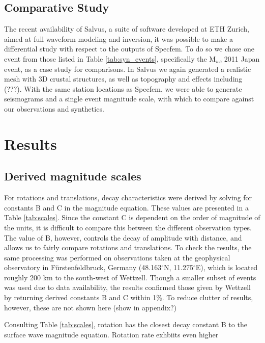 \documentclass{gji}
\begin{document}
\subsection{Comparative Study}
The recent availability of Salvus, a suite of software developed at ETH Zurich, aimed at full waveform modeling and inversion, it was possible to make a differential study with respect to the outputs of Specfem. To do so we chose one event from those listed in Table \ref{tab:syn_events}, specifically the M$_{wc}$ 2011 Japan event, as a case study for comparisons. In Salvus we again generated a realistic mesh with 3D crustal structures, as well as topography and effects including (???). With the same station locations as Specfem, we were able to generate seismograms and a single event magnitude scale, with which to compare against our observations and synthetics.

\section{Results}
\subsection{Derived magnitude scales}
For rotations and translations, decay characteristics were derived by solving for constants B and C in the magnitude equation. These values are presented in a Table \ref{tab:scales}. Since the constant C is dependent on the order of magnitude of the units, it is difficult to compare this between the different observation types. The value of B, however, controls the decay of amplitude with distance, and allows us to fairly compare rotations and translations. To check the results, the same processing was performed on observations taken at the geophysical observatory in F\"urstenfeldbruck, Germany (48.163$^\circ$N, 11.275$^\circ$E), which is located roughly 200 km to the south-west of Wettzell. Though a smaller subset of events was used due to data availability, the results confirmed those given by Wettzell by returning derived constants B and C within 1\%. To reduce clutter of results, however, these are not shown here (show in appendix?)

Consulting Table \ref{tab:scales}, rotation has the closest decay constant B to the surface wave magnitude equation. Rotation rate exhbiits even higher 
\end{document}
